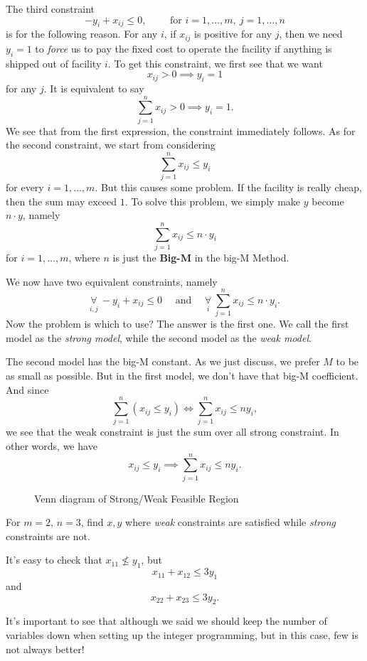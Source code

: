 \begin{note}
	The third constraint
	\[
		-y_{i} + x_{ij}\leq 0,\qquad \text{ for }i = 1, \ldots , m,\ j = 1, \ldots , n
	\]
	is for the following reason. For any \(i\), if \(x_{ij}\) is positive for any \(j\), then we need \(y_{i} = 1\) to \emph{force} us to pay the fixed cost
	to operate the facility if anything is shipped out of facility \(i\). To get this constraint, we first see that we want
	\[
		x_{ij}>0 \implies y_{i} = 1
	\]
	for any \(j\). It is equivalent to say
	\[
		\sum\limits_{j=1}^{n} x_{ij}>0 \implies y_{i} = 1.
	\]
	We see that from the first expression, the constraint immediately follows. As for the second constraint, we start from considering
	\[
		\sum\limits_{j=1}^{n} x_{ij}\leq y_{i}
	\]
	for every \(i = 1, \ldots , m\). But this causes some problem. If the facility is really cheap, then the sum may exceed \(1\).
	To solve this problem, we simply make \(y\) become \(n\cdot y\), namely
	\[
		\sum\limits_{j=1}^{n} x_{ij}\leq n\cdot y_{i}
	\]
	for \(i = 1, \ldots, m\), where \(n\) is just the \textbf{Big-M} in the big-M Method.
\end{note}

We now have two equivalent constraints, namely
\[
	\underset{i, j}{\forall }\ -y_{i} + x_{ij}\leq 0\quad  \text{ and }\quad \underset{i}{\forall }\ \sum\limits_{j=1}^{n} x_{ij}\leq n\cdot y_{i}.
\]
Now the problem is which to use? The answer is the first one. We call the first model as the \emph{strong model}, while the second model as
the \emph{weak model}.

\begin{intuition}
	The second model has the big-M constant. As we just discuss, we prefer \(M\) to be as small as possible. But in the first model, we don't have that
	big-M coefficient. And since
	\[
		\sum\limits_{j=1}^{n} \left(x_{ij}\leq y_i\right) \iff \sum\limits_{j=1}^{n} x_{ij}\leq n y_{i},
	\]
	we see that the weak constraint is just the sum over all strong constraint. In other words, we have
	\[
		x_{ij}\leq y_i \implies \sum\limits_{j=1}^{n} x_{ij}\leq n y_{i}.
	\]
	\begin{figure}[H]
		\centering
		\caption{Venn diagram of Strong/Weak Feasible Region}
		\label{fig:strong-weak-constraint}
	\end{figure}

	\begin{eg}
		For \(m = 2\), \(n = 3\), find \(x, y\) where \emph{weak} constraints are satisfied while \emph{strong} constraints are not.
		\begin{figure}[H]
			\centering
			\label{fig:integer-programming-eg2}
		\end{figure}
		It's easy to check that \(x_{11}\nleq y_1\), but
		\[
			x_{11}+x_{12} \leq 3y_1
		\]
		and
		\[
			x_{22}+x_{23}\leq 3y_2.
		\]
	\end{eg}
\end{intuition}
\begin{remark}
	It's important to see that although we said we should keep the number of variables down when setting up the integer programming, but in this case,
	few is not always better!
\end{remark}

